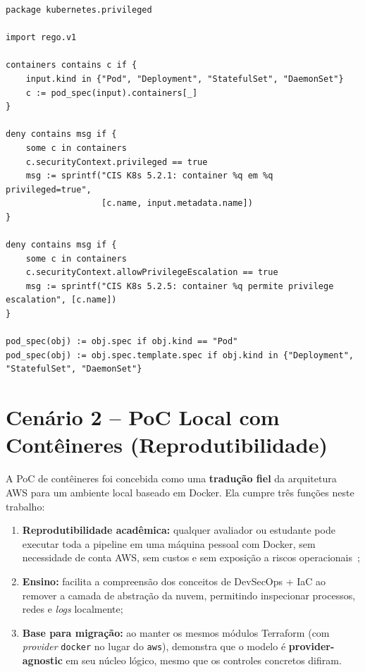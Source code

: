\begin{lstlisting}[language=Rego,caption={Política OPA \texttt{no\_privileged\_containers.rego}: bloqueia \textit{privileged}, \textit{hostNetwork}, \textit{hostPID}, \textit{hostIPC} e \textit{allowPrivilegeEscalation}.},label={lst:k8s-priv}]
package kubernetes.privileged

import rego.v1

containers contains c if {
    input.kind in {"Pod", "Deployment", "StatefulSet", "DaemonSet"}
    c := pod_spec(input).containers[_]
}

deny contains msg if {
    some c in containers
    c.securityContext.privileged == true
    msg := sprintf("CIS K8s 5.2.1: container %q em %q privileged=true",
                   [c.name, input.metadata.name])
}

deny contains msg if {
    some c in containers
    c.securityContext.allowPrivilegeEscalation == true
    msg := sprintf("CIS K8s 5.2.5: container %q permite privilege escalation", [c.name])
}

pod_spec(obj) := obj.spec if obj.kind == "Pod"
pod_spec(obj) := obj.spec.template.spec if obj.kind in {"Deployment", "StatefulSet", "DaemonSet"}
\end{lstlisting}

\section{Cenário 2 -- PoC Local com Contêineres (Reprodutibilidade)}
\label{sec:poc-containers}

A PoC de contêineres foi concebida como uma \textbf{tradução fiel} da arquitetura AWS para um ambiente local baseado em Docker. Ela cumpre três funções neste trabalho:

\begin{enumerate}
    \item \textbf{Reprodutibilidade acadêmica:} qualquer avaliador ou estudante pode executar toda a pipeline em uma máquina pessoal com Docker, sem necessidade de conta AWS, sem custos e sem exposição a riscos operacionais~;
    \item \textbf{Ensino:} facilita a compreensão dos conceitos de DevSecOps + IaC ao remover a camada de abstração da nuvem, permitindo inspecionar processos, redes e \textit{logs} localmente;
    \item \textbf{Base para migração:} ao manter os mesmos módulos Terraform (com \textit{provider} \texttt{docker} no lugar do \texttt{aws}), demonstra que o modelo é \textbf{provider-agnostic} em seu núcleo lógico, mesmo que os controles concretos difiram.
\end{enumerate}

